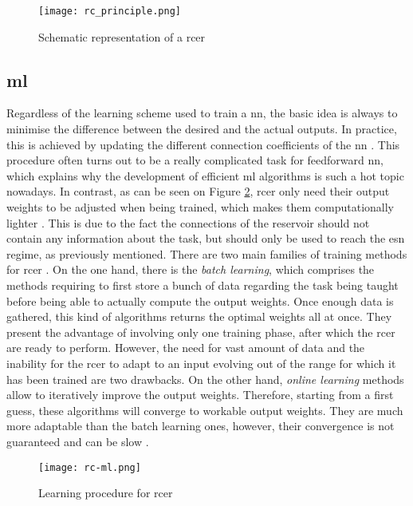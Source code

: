 \begin{figure}[h]
	\centering
	\texttt{[image: rc\_principle.png]}
	\caption{Schematic representation of a \acrlong{rcer} \cite{financialTimeSeries}}
	\label{rc_principle}
\end{figure}

\subsection{\acrlong{ml}}

Regardless of the learning scheme used to train a \gls{nn}, the basic idea is always to minimise the difference between the desired and the actual outputs. In practice, this is achieved by updating the different connection coefficients of the \gls{nn} \cite[p.233]{bishop2006pattern}\cite[p.733]{russell2010artificial}. This procedure often turns out to be a really complicated task for feedforward \gls{nn}, which explains why the development of efficient \gls{ml} algorithms is such a hot topic nowadays. In contrast, as can be seen on Figure \ref{rc-ml}, \gls{rcer} only need their output weights to be adjusted when being trained, which makes them computationally lighter \cite{Jaeger2004}. This is due to the fact the connections of the reservoir should not contain any information about the task, but should only be used to reach the \gls{esn} regime, as previously mentioned. There are two main families of training methods for \gls{rcer} \cite{Jaeger2002}. On the one hand, there is the \textit{batch learning}, which comprises the methods requiring to first store a bunch of data regarding the task being taught before being able to actually compute the output weights. Once enough data is gathered, this kind of algorithms returns the optimal weights all at once. They present the advantage of involving only one training phase, after which the \gls{rcer} are ready to perform. However, the need for vast amount of data and the inability for the \gls{rcer} to adapt to an input evolving out of the range for which it has been trained are two drawbacks. On the other hand, \textit{online learning} methods allow to iteratively improve the output weights. Therefore, starting from a first guess, these algorithms will converge to workable output weights. They are much more adaptable than the batch learning ones, however, their convergence is not guaranteed and can be slow \cite{JaegerTraining, schrauwen}.

\begin{figure}[h]
	\centering
	\texttt{[image: rc-ml.png]}
	\caption{Learning procedure for \acrlong{rcer} \cite{Goudarzi2014ACS}}
	\label{rc-ml}
\end{figure}

